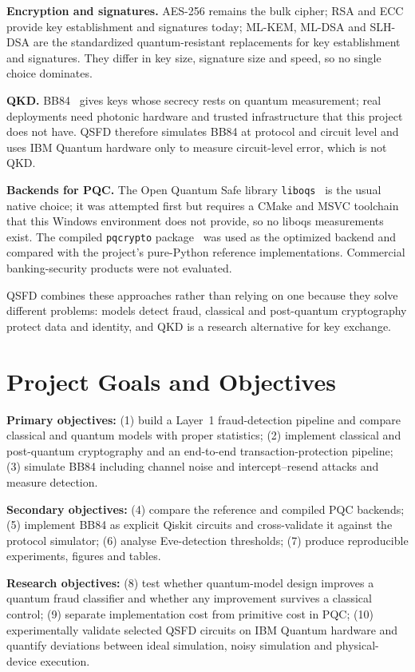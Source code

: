 \textbf{Encryption and signatures.} AES-256 remains the bulk cipher; RSA and ECC provide key establishment and signatures today; ML-KEM, ML-DSA and SLH-DSA are the standardized quantum-resistant replacements for key establishment and signatures. They differ in key size, signature size and speed, so no single choice dominates.

\textbf{QKD.} BB84~\cite{bb84} gives keys whose secrecy rests on quantum measurement; real deployments need photonic hardware and trusted infrastructure that this project does not have. QSFD therefore simulates BB84 at protocol and circuit level and uses IBM Quantum hardware only to measure circuit-level error, which is not QKD.

\textbf{Backends for PQC.} The Open Quantum Safe library \texttt{liboqs}~\cite{liboqs} is the usual native choice; it was attempted first but requires a CMake and MSVC toolchain that this Windows environment does not provide, so no liboqs measurements exist. The compiled \texttt{pqcrypto} package~\cite{pqcrypto} was used as the optimized backend and compared with the project's pure-Python reference implementations. Commercial banking-security products were not evaluated.

QSFD combines these approaches rather than relying on one because they solve different problems: models detect fraud, classical and post-quantum cryptography protect data and identity, and QKD is a research alternative for key exchange.

\section{Project Goals and Objectives}\label{sec:goals}
\textbf{Primary objectives:} (1) build a Layer~1 fraud-detection pipeline and compare classical and quantum models with proper statistics; (2) implement classical and post-quantum cryptography and an end-to-end transaction-protection pipeline; (3) simulate BB84 including channel noise and intercept--resend attacks and measure detection.

\textbf{Secondary objectives:} (4) compare the reference and compiled PQC backends; (5) implement BB84 as explicit Qiskit circuits and cross-validate it against the protocol simulator; (6) analyse Eve-detection thresholds; (7) produce reproducible experiments, figures and tables.

\textbf{Research objectives:} (8) test whether quantum-model design improves a quantum fraud classifier and whether any improvement survives a classical control; (9) separate implementation cost from primitive cost in PQC; (10) experimentally validate selected QSFD circuits on IBM Quantum hardware and quantify deviations between ideal simulation, noisy simulation and physical-device execution.
